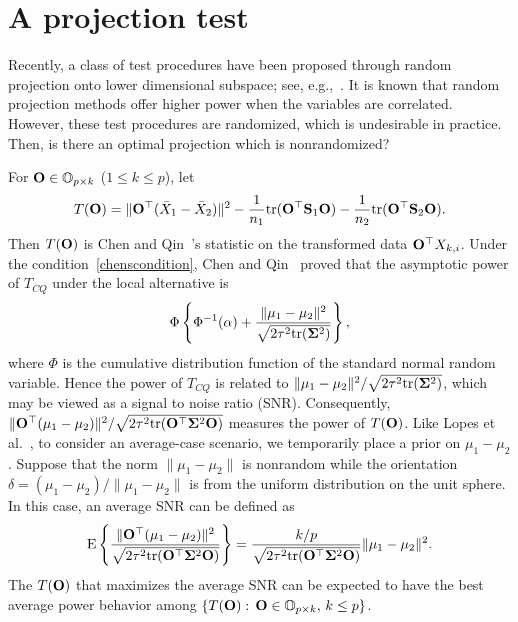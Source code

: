 \documentclass[times,sort&compress,3p]{elsarticle}
\newcommand{\mytr}{ {\rm tr} }
\newcommand{\myE}{ {\rm E} }
\theoremstyle{plain}
\theoremstyle{definition}
\theoremstyle{remark}
\begin{document}
\section{A projection test}\label{methodology}


Recently, a class of test procedures have been proposed through random projection onto lower dimensional subspace; see, e.g.,~\cite{Lopes2015A,Srivastava2014RAPTT,Thulin2014A}.
It is known that random projection methods offer higher power when the variables are correlated.
However, these test procedures are randomized, which is undesirable in practice.
Then, is there an optimal projection which is nonrandomized?

For $\mathbf{O}\in \mathbb{O}_{p\times k}$ ($1\leq k\leq p$), let
$$
    T(\BO)=\|\BO^\top (\bar{X}_1-\bar{X}_2)\|^2-\frac{1}{n_1}\mytr(\BO^\top  \BS_1\BO)-\frac{1}{n_2}\mytr(\BO^\top  \BS_2\BO).
$$
Then $T(\mathbf{O})$ is Chen and Qin~\cite{Chen2010A}'s statistic on the transformed data $\mathbf{O}^\top  X_{k,i}$.
Under the condition~\eqref{chenscondition}, Chen and Qin~\cite{Chen2010A} proved that the asymptotic power of $T_{CQ}$ under the local alternative is
$$
\Phi\left\{\Phi^{-1}(\alpha)+\frac{\|\mu_1-\mu_2\|^2}{\sqrt{2\tau^2\mytr(\bSigma^2)}}\right\},
$$
where $\Phi$ is the cumulative distribution function of the standard normal random variable.
Hence the power of $T_{CQ}$ is related to $\|\mu_1-\mu_2\|^2/\sqrt{2\tau^2\mytr(\bSigma^2)}$, which may be viewed as a signal to noise ratio (SNR).
Consequently, $\|\BO^\top  (\mu_1-\mu_2)\|^2/\sqrt{2\tau^2\mytr(\BO^\top  \bSigma^2 \BO)}$ measures the power of $T(\mathbf{O})$.
 Like Lopes {\rm et al.}~\cite{Lopes2015A}, to consider an average-case scenario, we temporarily place a prior on $\mu_1-\mu_2$.
Suppose that the norm $\|\mu_1-\mu_2\|$ is nonrandom while the orientation $\delta=(\mu_1-\mu_2)/\|\mu_1-\mu_2\|$ is from the uniform distribution on the unit sphere.
In this case, an average SNR can be defined as
\begin{equation}\label{touteng}
    \myE \left\{ \frac{\|\BO^\top  (\mu_1-\mu_2)\|^2}{\sqrt{2\tau^2\mytr(\BO^\top  \bSigma^2 \BO)}} \right\}
=  \frac{k/p}{\sqrt{2\tau^2\mytr(\BO^\top  \bSigma^2 \BO)}}\|\mu_1-\mu_2\|^2.
\end{equation}
The $T(\mathbf{O})$ that maximizes the average SNR can be expected to have the best average power behavior among $\{T(\mathbf{O}):\, \mathbf{O}\in \mathbb{O}_{p\times k},\,  k\leq p\}$.
\end{document}
